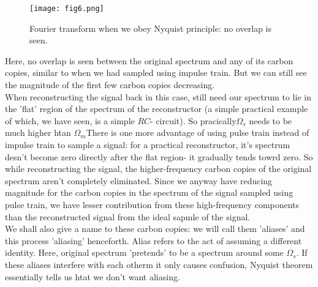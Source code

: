 \begin{figure}[htb]
\centering
\texttt{[image: fig6.png]}
\caption{Fourier transform when we obey Nyquist principle: no overlap is seen.}
\end{figure}

Here, no overlap is seen between the original spectrum and any of its carbon copies, similar to when we had sampled using impulse train. But we can still see the magnitude of the first few carbon copies decreasing.\\
When reconstructing the signal back in this case, still need our spectrum to lie in the 'flat' region of the spectrum of the reconstructor (a simple practical example of which,  we have seen, is a simple $RC$- circuit). So pracically$\Omega_s$ needs to be much higher htan $\Omega_m$There is one more advantage of using pulse train instead of impulse train to sample a signal: for a practical reconstructor, it's spectrum desn't become zero directly after the flat region- it gradually tends towrd zero. So while reconstructing the signal, the higher-frequency carbon copies of the original spectrum aren't completely eliminated. Since we anyway have reducing magnitude for the carbon copies in the spectrum of the signal sampled using pulse train, we have lesser contribution from these high-frequency components than the reconstructed signal from the ideal sapmle of the signal.\\
We shall also give a name to these carbon copies: we will call them 'aliases' and this process 'aliasing' henceforth. Alias refers to the act of assuming a different identity. Here, original spectrum 'pretends' to be a spectrum around some $\Omega_s$. If these aliases interfere with each otherm it only causes confusion, Nyquist theorem essentially tells us htat we don't want aliasing.
